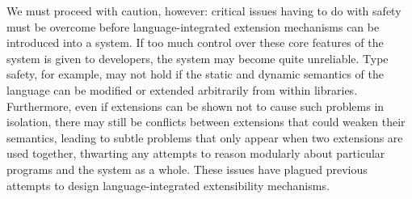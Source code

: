 We must proceed with caution, however: critical issues having to do with {safety} must be overcome before language-integrated extension mechanisms can be introduced into a system. If too much control over  these core features of the system is given  to developers, the system may become quite unreliable. 
Type safety, for example, may not hold if the static and dynamic semantics of the language can be modified or extended arbitrarily from within libraries. Furthermore, even if extensions can be shown not to cause such problems in isolation, there may still be conflicts between extensions that could weaken their semantics, leading to subtle problems that only appear when two extensions are used together, thwarting any attempts to reason modularly about particular programs and the system as a whole. %
These issues have plagued previous attempts to design language-integrated extensibility mechanisms.%





